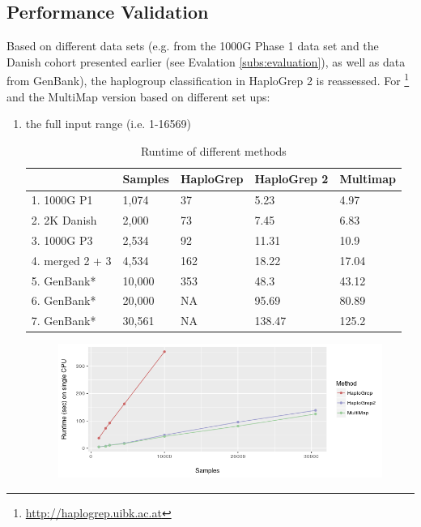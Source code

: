 \subsection{Performance Validation}
Based on different data sets (e.g. from the 1000G Phase 1 data set and the Danish cohort presented earlier (see Evalation \ref{subs:evaluation}), as well as data from GenBank), the haplogroup classification in HaploGrep 2 is reassessed. For  \footnote{\url{http://haplogrep.uibk.ac.at}} and the MultiMap version based on different set ups:
\begin{enumerate}[label=(\alph*)]
\item  the full input range (i.e. 1-16569)
\begin{table}[H]
\centering
\caption{Runtime of different methods}
\label{hg:runtime1}
\begin{tabular}{|l|l|l|l|l|}
\hline
             & Samples & HaploGrep & HaploGrep 2 & Multimap \\ \hline
1. 1000G P1  & 1,074   & 37  & 5.23        & 4.97         \\ \hline
2. 2K Danish & 2,000   & 73 & 7.45       & 6.83        \\ \hline
3. 1000G P3  & 2,534   & 92 & 11.31      & 10.9         \\ \hline
4. merged 2 + 3 & 4,534   & 162 & 18.22       & 17.04        \\ \hline
5. GenBank* & 10,000   & 353 & 48.3       & 43.12         \\ \hline
6. GenBank*  & 20,000   & NA & 95.69       & 80.89         \\ \hline
7. GenBank*  & 30,561   & NA & 138.47      & 125.2        \\ \hline
\end{tabular}
\end{table}

\begin{figure}[!ht]
    \centering
    \includegraphics[width=1\textwidth]{images/multimap.png}
    \caption[Run time comparison of HaploGrep versions]{} 
    \label{hg:mutlimap}
\end{figure}


\end{enumerate}
